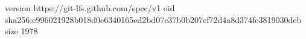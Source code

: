 version https://git-lfs.github.com/spec/v1
oid sha256:e996021928b018d0e6340165ed2bd07c37b0b207ef72d4a8d374fe3819030deb
size 1978
